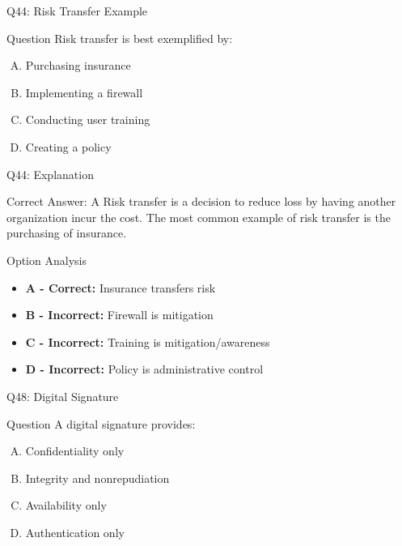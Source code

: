\documentclass{beamer}
\begin{document}
	\begin{frame}{Q44: Risk Transfer Example}
		\begin{block}{Question}
			Risk transfer is best exemplified by:
		\end{block}
		\begin{enumerate}[(A)]
			\item Purchasing insurance
			\item Implementing a firewall
			\item Conducting user training
			\item Creating a policy
		\end{enumerate}
	\end{frame}
	
	\begin{frame}{Q44: Explanation}
		\begin{block}{Correct Answer: A}
			Risk transfer is a decision to reduce loss by having another organization incur the cost. The most common example of risk transfer is the purchasing of insurance.
		\end{block}
		\begin{block}{Option Analysis}
			\begin{itemize}
				\item \textbf{A - Correct:} Insurance transfers risk
				\item \textbf{B - Incorrect:} Firewall is mitigation
				\item \textbf{C - Incorrect:} Training is mitigation/awareness
				\item \textbf{D - Incorrect:} Policy is administrative control
			\end{itemize}
		\end{block}
	\end{frame}
	
	

	
	\begin{frame}{Q48: Digital Signature}
		\begin{block}{Question}
			A digital signature provides:
		\end{block}
		\begin{enumerate}[(A)]
			\item Confidentiality only
			\item Integrity and nonrepudiation
			\item Availability only
			\item Authentication only
		\end{enumerate}
	\end{frame}
	
\end{document}
